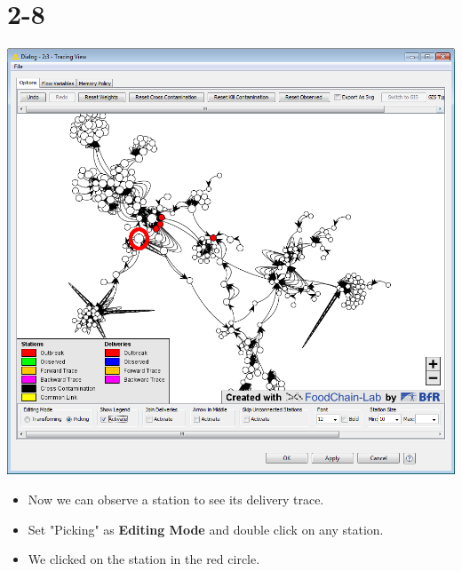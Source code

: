 \documentclass{beamer}
\begin{document}
\section{2-8}
\begin{frame}
	\begin{center}
  		\includegraphics[height=0.6\textheight]{2-8.png}
	\end{center}
	\begin{itemize}
		\item Now we can observe a station to see its delivery trace.
		\item Set "Picking" as \textbf{Editing Mode} and double click on any station.
		\item We clicked on the station in the red circle.
	\end{itemize}
\end{frame}
\end{document}
